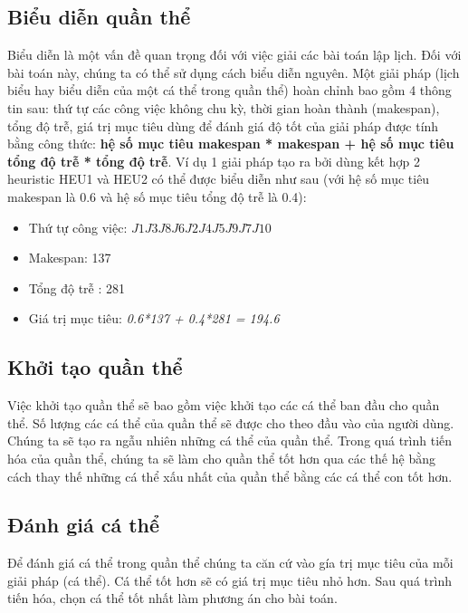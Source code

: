 \documentclass[a4paper,12pt]{article}
\begin{document}
\subsection{Biểu diễn quần thể}
Biểu diễn là một vấn đề quan trọng đối với việc giải các bài toán lập lịch. Đối với bài toán này, chúng ta có thể sử dụng cách biểu diễn nguyên. Một giải pháp (lịch biểu hay biểu diễn của một cá thể trong quần thể) hoàn chỉnh bao gồm 4 thông tin sau: thứ tự các công việc không chu kỳ, thời gian hoàn thành (makespan), tổng độ trễ, giá trị mục tiêu dùng để đánh giá độ tốt của giải pháp được tính bằng công thức: \textbf{hệ số mục tiêu makespan * makespan + hệ số mục tiêu tổng độ trễ * tổng độ trễ\textit{}}. Ví dụ 1 giải pháp tạo ra bởi dùng kết hợp 2 heuristic HEU1 và HEU2 có thể được biểu diễn như sau (với hệ số mục tiêu makespan là 0.6 và hệ số mục tiêu tổng độ trễ là 0.4):
\begin{itemize}
\item
Thứ tự công việc: $J1 J3 J8 J6 J2 J4 J5 J9 J7 J10$
\item
Makespan: 137
\item
Tổng độ trễ : 281
\item
Giá trị mục tiêu: \textit{0.6*137 + 0.4*281 = 194.6}
\end{itemize}
\subsection{Khởi tạo quần thể}
Việc khởi tạo quần thể sẽ bao gồm việc khởi tạo các cá thể ban đầu cho quần thể. Số lượng các cá thể của quần thể sẽ được cho theo đầu vào của người dùng. Chúng ta sẽ tạo ra ngẫu nhiên những cá thể của quần thể. Trong quá trình tiến hóa của quần thể, chúng ta sẽ làm cho quần thể tốt hơn qua các thế hệ bằng cách thay thế những cá thể xấu nhất của quần thể bằng các cá thể con tốt hơn.
\subsection{Đánh giá cá thể}
Để đánh giá cá thể trong quần thể chúng ta căn cứ vào gía trị mục tiêu của mỗi giải pháp (cá thể). Cá thể tốt hơn sẽ có giá trị mục tiêu nhỏ hơn. Sau quá trình tiến hóa, chọn cá thể tốt nhất làm phương án cho bài toán.
\end{document}
